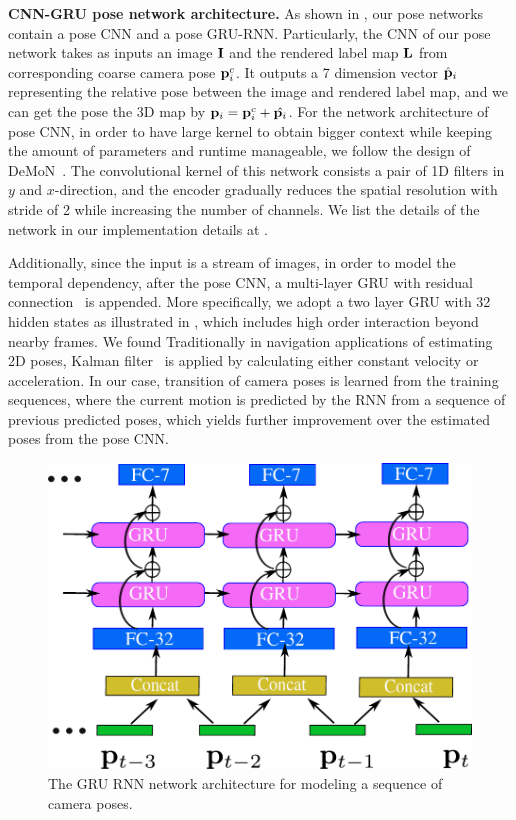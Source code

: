 \textbf{CNN-GRU pose network architecture.}
As shown in , our pose networks contain a pose CNN and a pose GRU-RNN. Particularly,
the CNN of our pose network takes as inputs an image ${\mathbf I}$ and the rendered label map ${\mathbf L}$ from corresponding coarse camera pose ${\mathbf p}_i^c$. It outputs a 7 dimension vector $\hat{{\mathbf p}}_i$ representing the relative pose between the image and rendered label map, and we can get the pose \wrt the 3D map by ${\mathbf p}_i = {\mathbf p}_i^c + \hat{{\mathbf p}_i}$.
For the network architecture of pose CNN, in order to have large kernel to obtain bigger context while keeping the amount of parameters and runtime manageable, we follow the design of DeMoN~\cite{ummenhofer2016demon}. The convolutional kernel of this network consists a pair of 1D filters in $y$ and $x$-direction, and the encoder gradually reduces the spatial resolution with stride of 2 while increasing the number of channels. We list the details of the network in our implementation details at .

Additionally, since the input is a stream of images, in order to model the temporal dependency,
after the pose CNN, a multi-layer GRU with residual connection~\cite{wu2016google} is appended. More specifically, we adopt a two layer GRU with 32 hidden states as illustrated in , which includes high order interaction beyond nearby frames. We found 
Traditionally in navigation applications of estimating 2D poses,  Kalman filter~\cite{kalman1960new} is applied by calculating either constant velocity or acceleration.
In our case, transition of camera poses is learned from the training sequences, where the current motion is predicted by the RNN from a sequence of previous predicted poses, which yields further improvement over the estimated poses from the pose CNN.

\begin{figure}[t]
\begin{center}
\includegraphics[width=\linewidth]{fig/RNN.pdf}
\end{center}
   \caption{The GRU RNN network architecture for modeling a sequence of camera poses.}
\label{fig:rnn}
\end{figure}


